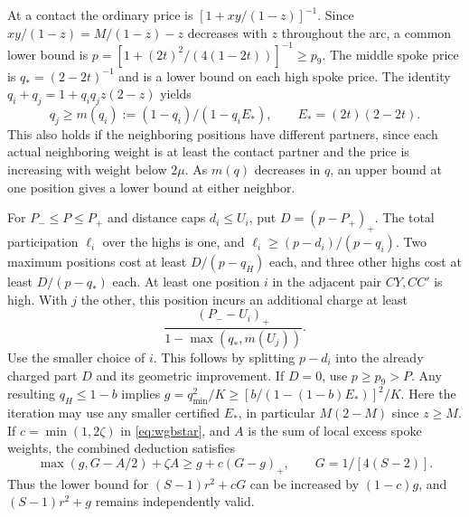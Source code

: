 \documentclass[11pt,a4paper]{article}
\theoremstyle{definition}
\begin{document}
At a contact the ordinary price is
$[1+xy/(1-z)]^{-1}$. Since $xy/(1-z)=M/(1-z)-z$ decreases with
$z$ throughout the arc, a common lower bound is
$p=[1+(2t)^2/(4(1-2t))]^{-1}\ge p_9$. The middle spoke price is
$q_*=(2-2t)^{-1}$ and is a lower bound on each high spoke price.
The identity
$q_i+q_j=1+q_iq_j z(2-z)$ yields
\[
 q_j\ge m(q_i):=(1-q_i)/(1-q_i E_*),\qquad
 E_*=(2t)(2-2t).
\]
This also holds if the neighboring positions have different partners, since
each actual neighboring weight is at least the contact partner and
the price is increasing with weight below $2\mu$. As $m(q)$
decreases in $q$, an upper bound at one position gives a lower
bound at either neighbor.

For $P_-\le P\le P_+$ and distance caps $d_i\le U_i$, put
$D=(p-P_+)_+$. The total participation $\ell_i$ over the highs
is one, and $\ell_i\ge(p-d_i)/(p-q_i)$. Two maximum positions
cost at least $D/(p-q_H)$ each, and three other highs cost at least
$D/(p-q_*)$ each. At least one position $i$ in the adjacent pair
$CY,CC'$ is high. With $j$ the other, this position incurs an
additional charge at least
\[
 \frac{(P_--U_i)_+}{1-\max(q_*,m(U_j))}.
\]
Use the smaller choice of $i$. This follows by splitting $p-d_i$
into the already charged part $D$ and its geometric improvement.
If $D=0$, use $p\ge p_9>P$. Any resulting $q_H\le1-b$ implies
$g=q_{\min}^2/K\ge[b/(1-(1-b)E_*)]^2/K$.
Here the iteration may use any smaller certified $E_*$, in particular
$M(2-M)$ since $z\ge M$. If $c=\min(1,2\zeta)$ in
\eqref{eq:wgbstar}, and $A$ is the sum of local excess spoke
weights, the combined deduction satisfies
\[
 \max(g,G-A/2)+\zeta A\ge g+c(G-g)_+,\qquad
 G=1/[4(S-2)] .
\]
Thus the lower bound for $(S-1)r^2+cG$ can be increased by
$(1-c)g$, and $(S-1)r^2+g$ remains independently valid.
\end{document}
